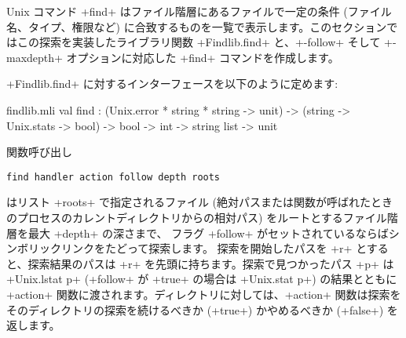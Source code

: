 Unix コマンド \ml+find+ はファイル階層にあるファイルで一定の条件 (ファイル名、タイプ、権限など) に合致するものを一覧で表示します。このセクションではこの探索を実装したライブラリ関数 \ml+Findlib.find+ と、\ml+-follow+ そして \ml+-maxdepth+ オプションに対応した \ml+find+ コマンドを作成します。

\ml+Findlib.find+ に対するインターフェースを以下のように定めます:
%
\begin{listingcodefile}{findlib.mli}
val find :
  (Unix.error * string * string -> unit) ->
  (string -> Unix.stats -> bool) -> bool -> int -> string list ->
  unit
\end{listingcodefile}
%
関数呼び出し
\begin{lstlisting}
find handler action follow depth roots
\end{lstlisting}
はリスト \ml+roots+ で指定されるファイル (絶対パスまたは関数が呼ばれたときのプロセスのカレントディレクトリからの相対パス) をルートとするファイル階層を最大 \ml+depth+ の深さまで、 フラグ \ml+follow+ がセットされているならばシンボリックリンクをたどって探索します。 探索を開始したパスを \ml+r+ とすると、探索結果のパスは \ml+r+ を先頭に持ちます。探索で見つかったパス \ml+p+ は \ml+Unix.lstat p+ (\ml+follow+ が \ml+true+ の場合は \ml+Unix.stat p+) の結果とともに \ml+action+ 関数に渡されます。ディレクトリに対しては、\ml+action+ 関数は探索をそのディレクトリの探索を続けるべきか (\ml+true+) かやめるべきか (\ml+false+) を返します。

